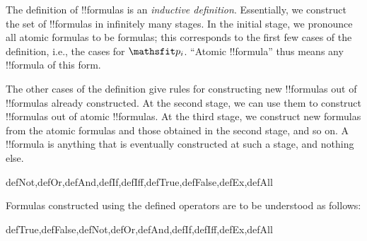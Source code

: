 \documentclass[../../../include/open-logic-section]{subfiles}
\begin{document}
\begin{explain}
The definition of !!{formula}s is an
\emph{inductive definition}.  Essentially, we construct the set of
!!{formula}s in infinitely many stages.  In the initial stage, we
pronounce all atomic formulas to be formulas; this corresponds to the
first few cases of the definition, i.e., the cases for
%
%
$\Obj p_i$.  ``Atomic !!{formula}''
thus means any !!{formula} of this form.

The other cases of the definition give rules for constructing new
!!{formula}s out of !!{formula}s already constructed.  At the second
stage, we can use them to construct !!{formula}s out of atomic
!!{formula}s.  At the third stage, we construct new formulas from the
atomic formulas and those obtained in the second stage, and so on.  A
!!{formula} is anything that is eventually constructed at such a
stage, and nothing else.
\end{explain}

\begin{tagblock}{defNot,defOr,defAnd,defIf,defIff,defTrue,defFalse,defEx,defAll}
\begin{defn}
Formulas constructed using the defined operators are to be understood
as follows:

\begin{tagenumerate}{defTrue,defFalse,defNot,defOr,defAnd,defIf,defIff,defEx,defAll}







\end{tagenumerate}
\end{defn}
\end{tagblock}
\end{document}
